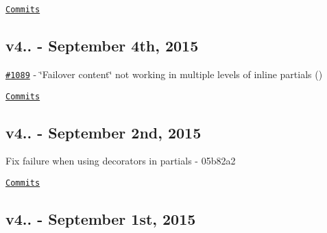 \href{https://github.com/wycats/handlebars.js/compare/v4.0.2...v4.0.3}{\tt Commits}

\subsection*{v4.. -\/ September 4th, 2015}


\begin{DoxyItemize}
\item \href{https://github.com/wycats/handlebars.js/issues/1089}{\tt \#1089} -\/ \char`\"{}\+Failover content\char`\"{} not working in multiple levels of inline partials (\href{https://api.github.com/users/michaellopez}{\tt })
\end{DoxyItemize}

\href{https://github.com/wycats/handlebars.js/compare/v4.0.1...v4.0.2}{\tt Commits}

\subsection*{v4.. -\/ September 2nd, 2015}


\begin{DoxyItemize}
\item Fix failure when using decorators in partials -\/ 05b82a2
\end{DoxyItemize}

\href{https://github.com/wycats/handlebars.js/compare/v4.0.0...v4.0.1}{\tt Commits}

\subsection*{v4.. -\/ September 1st, 2015}


